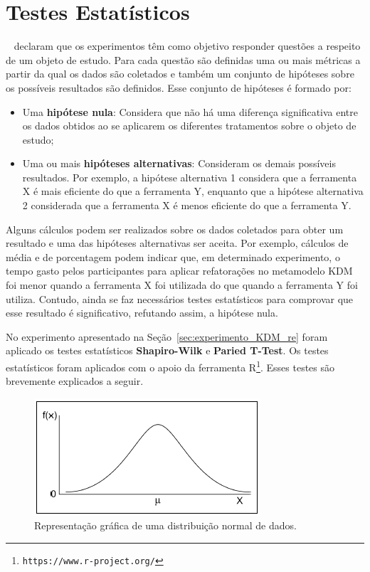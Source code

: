 \section{Testes Estatísticos}\label{sec:teste_estatisticos}

~ declaram que os experimentos têm como objetivo responder questões a respeito de um objeto de estudo. Para cada questão são definidas uma ou mais métricas a partir da qual os dados são coletados e também um conjunto de hipóteses sobre os possíveis resultados são definidos. Esse conjunto de hipóteses é formado por:

\begin{itemize}
\item Uma \textbf{hipótese nula}: Considera que não há uma diferença significativa entre os dados obtidos ao se aplicarem os diferentes tratamentos sobre o objeto de estudo;
\item Uma ou mais \textbf{hipóteses alternativas}: Consideram os demais possíveis resultados. Por exemplo, a hipótese alternativa 1 considera que a ferramenta X é mais eficiente do que a ferramenta Y, enquanto que a hipótese alternativa 2 considerada que a ferramenta X é menos eficiente do que a ferramenta Y.
\end{itemize}

Alguns cálculos podem ser realizados sobre os dados coletados para obter um resultado e uma das hipóteses alternativas ser aceita. Por exemplo, cálculos de média e de porcentagem podem indicar que, em determinado experimento, o tempo gasto pelos participantes para aplicar refatorações no metamodelo KDM foi menor quando a ferramenta X foi utilizada do que quando a ferramenta Y foi utiliza. Contudo, ainda se faz necessários testes estatísticos para comprovar que esse resultado é significativo, refutando assim, a hipótese nula.

No experimento apresentado na Seção~\ref{sec:experimento_KDM_re} foram aplicado os testes estatísticos \textbf{Shapiro-Wilk} e \textbf{Paried T-Test}. Os testes estatísticos foram aplicados com o apoio da ferramenta R\footnote{\texttt{https://www.r-project.org/}}. Esses testes são brevemente explicados a seguir.%

\begin{figure}[h]
	\centering
	\caption{Representação gráfica de uma distribuição normal de dados.}
	\label{fig:shapiro_wilk}
	\includegraphics[scale=0.9]{images/distribuicao_normal}
	\fautor
\end{figure}

